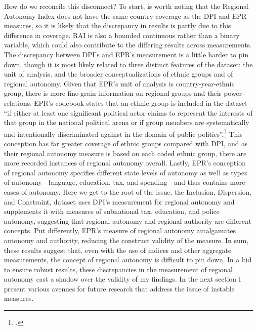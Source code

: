 \documentclass[12pt]{article}
\begin{document}
How do we reconcile this disconnect? To start, is worth noting that the Regional Autonomy Index does not have the same country-coverage as the DPI and EPR measures, so it is likely that the discrepancy in results is partly due to this difference in coverage. RAI is also a bounded continuous rather than a binary variable, which could also contribute to the differing results across measurements. The discrepancy between DPI's and EPR's measurement is a little harder to pin down, though it is most likely related to three distinct features of the dataset: the unit of analysis, and the broader conceptualizations of ethnic groups and of regional autonomy. Given that EPR's unit of analysis is country-year-ethnic group, there is more fine-grain information on regional groups and their power-relations. EPR's codebook states that an ethnic group is included in the dataset ``if either at least one significant political actor claims to represent the interests of that group in the national political arena or if group members are systematically and intentionally discriminated against in the domain of public politics''.\footcite{vogt_integrating_2015} This conception has far greater coverage of ethnic groups compared with DPI, and as their regional autonomy measure is based on each coded ethnic group, there are more recorded instances of regional autonomy overall. Lastly, EPR's conception of regional autonomy specifies different state levels of autonomy as well as types of autonomy---language, education, tax, and spending---and thus contains more cases of autonomy. Here we get to the root of the issue, the Inclusion, Dispersion, and Constraint, dataset uses DPI's measurement for regional autonomy and supplements it with measures of subnational tax, education, and police autonomy, suggesting that regional autonomy and regional authority are different concepts. Put differently, EPR's measure of regional autonomy amalgamates autonomy and authority, reducing the construct validity of the measure. In sum, these results suggest that, even with the use of indices and other aggregate measurements, the concept of regional autonomy is difficult to pin down. In a bid to ensure robust results, these discrepancies in the measurement of regional autonomy cast a shadow over the validity of my findings. In the next section I present various avenues for future research that address the issue of instable measures. 
\end{document}
